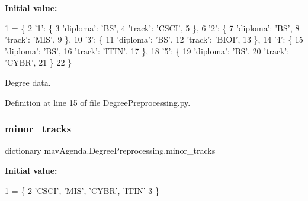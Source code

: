 {\bfseries Initial value\+:}
\begin{DoxyCode}
1 =  \{
2     \textcolor{stringliteral}{'1'}: \{
3         \textcolor{stringliteral}{'diploma'}: \textcolor{stringliteral}{'BS'},
4         \textcolor{stringliteral}{'track'}: \textcolor{stringliteral}{'CSCI'},
5     \},
6     \textcolor{stringliteral}{'2'}: \{
7         \textcolor{stringliteral}{'diploma'}: \textcolor{stringliteral}{'BS'},
8         \textcolor{stringliteral}{'track'}: \textcolor{stringliteral}{'MIS'},
9     \},
10     \textcolor{stringliteral}{'3'}: \{
11         \textcolor{stringliteral}{'diploma'}: \textcolor{stringliteral}{'BS'},
12         \textcolor{stringliteral}{'track'}: \textcolor{stringliteral}{'BIOI'},
13     \},
14     \textcolor{stringliteral}{'4'}: \{
15         \textcolor{stringliteral}{'diploma'}: \textcolor{stringliteral}{'BS'},
16         \textcolor{stringliteral}{'track'}: \textcolor{stringliteral}{'ITIN'},
17     \},
18     \textcolor{stringliteral}{'5'}: \{
19         \textcolor{stringliteral}{'diploma'}: \textcolor{stringliteral}{'BS'},
20         \textcolor{stringliteral}{'track'}: \textcolor{stringliteral}{'CYBR'},
21     \}
22 \}
\end{DoxyCode}


Degree data. 



Definition at line 15 of file Degree\+Preprocessing.\+py.

\mbox{\label{namespacemavAgenda_1_1DegreePreprocessing_a7248b951059f4a9ad766000590ecb727}} 
\subsubsection{\texorpdfstring{minor\+\_\+tracks}{minor\_tracks}}
{\footnotesize\ttfamily dictionary mav\+Agenda.\+Degree\+Preprocessing.\+minor\+\_\+tracks}

{\bfseries Initial value\+:}
\begin{DoxyCode}
1 =  \{
2     \textcolor{stringliteral}{'CSCI'}, \textcolor{stringliteral}{'MIS'}, \textcolor{stringliteral}{'CYBR'}, \textcolor{stringliteral}{'ITIN'}
3 \}
\end{DoxyCode}


